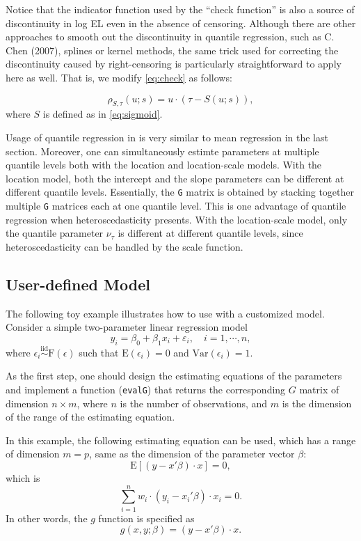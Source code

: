 \documentclass[article]{jss}
\renewcommand{\|}{\,|\,}
\begin{document}
Notice that the indicator function used by the ``check function'' is also a source of discontinuity in log EL even in the absence of censoring. Although there are other approaches to smooth out the discontinuity in quantile regression, such as C. Chen (2007), splines or kernel methods, the same trick used for correcting the discontinuity caused by right-censoring is particularly straightforward to apply here as well. That is, we modify \eqref{eq:check} as follows:

\begin{equation}
\rho_{S,\tau}(u;s) = u\cdot(\tau - S(u;s)),
\end{equation}
where \(S\) is defined as in \eqref{eq:sigmoid}.

Usage of quantile regression in  is very similar to mean regression in the last section. Moreover, one can simultaneously estimte parameters at multiple quantile levels both with the location and location-scale models. With the location model, both the intercept and the slope parameters can be different at different quantile levels. Essentially, the \texttt{G} matrix is obtained by stacking together multiple \texttt{G} matrices each at one quantile level. This is one advantage of quantile regression when heteroscedasticity presents. With the location-scale model, only the quantile parameter \(\nu_{\tau}\) is different at different quantile levels, since heteroscedasticity can be handled by the scale function.

\hypertarget{user-defined-model}{%
\subsection{User-defined Model}\label{user-defined-model}}

The following toy example illustrates how to use  with a customized model. Consider a simple two-parameter linear regression model
\[
  y_i = \beta_0 + \beta_1x_i + \varepsilon_i, \quad i=1,\cdots,n,
\]
where \(\epsilon_i \stackrel {\textrm{iid}}{\sim}\text{F}(\epsilon)\) such that \(\textrm{E}(\epsilon_i) = 0\) and \(\text{Var}(\epsilon_i) = 1\).

As the first step, one should design the estimating equations of the parameters and implement a function (\texttt{evalG}) that returns the corresponding \(G\) matrix of dimension \(n\times m\), where \(n\) is the number of observations, and \(m\) is the dimension of the range of the estimating equation.

In this example, the following estimating equation can be used, which has a range of dimension \(m=p\), same as the dimension of the parameter vector \(\beta\):
\[
  \textrm{E}[(y-x'\beta)\cdot x] = 0,
\]
which is
\[
  \sum_{i=1}^n w_i\cdot (y_i-x_i'\beta)\cdot x_i = 0.
\]
In other words, the \(g\) function is specified as
\[
  g(x,y;\beta) = (y-x'\beta)\cdot x.
\]
\end{document}
